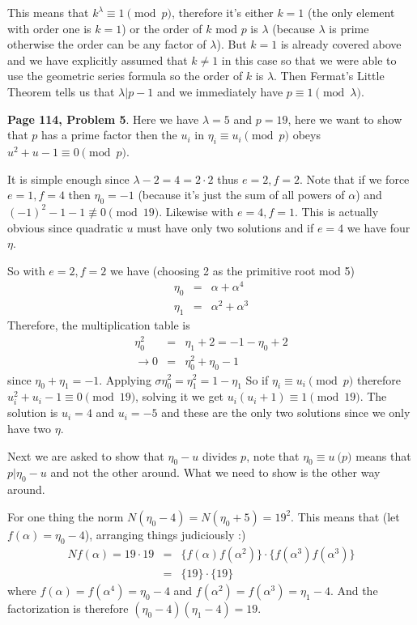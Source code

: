 \documentclass[aps,preprint,preprintnumbers,nofootinbib,showpacs,prd]{revtex4-1}
\newcommand{\nbea}{\begin{eqnarray*}}
\newcommand{\neea}{\end{eqnarray*}}
\begin{document}
This means that $k^\lambda \equiv 1 \pmod{p}$, therefore it's either $k = 1$ (the only element with order one is $k = 1$) or the order of $k$ mod $p$ is $\lambda$ (because $\lambda$ is prime otherwise the order can be any factor of $\lambda$). But $k = 1$ is already covered above and we have explicitly assumed that $k\neq1$ in this case so that we were able to use the geometric series formula so the order of $k$ is $\lambda$. Then Fermat's Little Theorem tells us that $\lambda|p - 1$ and we immediately have $p \equiv 1 \pmod{\lambda}$.

{\bf Page 114, Problem 5}. Here we have $\lambda = 5$ and $p = 19$, here we want to show that $p$ has a prime factor then the $u_i$ in $\eta_i \equiv u_i \pmod{p}$ obeys $u^2 + u - 1 \equiv 0 \pmod{p}$.

It is simple enough since $\lambda - 2 = 4 = 2\cdot 2$ thus $e = 2, f = 2$. Note that if we force $e = 1, f = 4$ then $\eta_0 = -1$ (because it's just the sum of all powers of $\alpha$) and $(-1)^2 - 1 - 1 \not \equiv 0 \pmod{19}$. Likewise with $e = 4, f = 1$. This is actually obvious since quadratic $u$ must have only two solutions and if $e = 4$ we have four $\eta$.

So with $e = 2, f = 2$ we have (choosing 2 as the primitive root mod 5)
%
\nbea
\eta_0 & = & \alpha + \alpha^4 \\
\eta_1 & = & \alpha^2 + \alpha^3
\neea
% 
Therefore, the multiplication table is
%
\nbea
\eta_0^2 & = & \eta_1 + 2 = -1 - \eta_0 +2 \\
\to 0 & = & \eta_0^2 + \eta_0 - 1
\neea
%
since $\eta_0 + \eta_1 = -1$. Applying $\sigma\eta_0^2 = \eta_1^2 = 1 - \eta_1$ So if $\eta_i \equiv u_i \pmod{p}$ therefore $u_i^2 + u_i - 1 \equiv 0 \pmod{19}$, solving it we get $u_i(u_i + 1) \equiv 1 \pmod{19}$. The solution is $u_i = 4$ and $u_i = -5$ and these are the only two solutions since we only have two $\eta$.

Next we are asked to show that $\eta_0 - u$ divides $p$, note that $\eta_0 \equiv u \pod{p}$ means that $p|\eta_0 - u$ and not the other around. What we need to show is the other way around.

For one thing the norm $N(\eta_0 - 4) = N(\eta_0 + 5) = 19^2$. This means that (let $f(\alpha) = \eta_0 - 4$), arranging things judiciously :)
%
\nbea
Nf(\alpha) = 19\cdot 19 & = & \{f(\alpha)f(\alpha^2) \} \cdot \{f(\alpha^3)f(\alpha^3)\} \\
& = & \{19 \} \cdot \{19\}
\neea
%
where $f(\alpha) = f(\alpha^4) = \eta_0 - 4$ and $f(\alpha^2) = f(\alpha^3) = \eta_1 - 4$. And the factorization is therefore $(\eta_0 - 4)(\eta_1 - 4) = 19$.
\end{document}
